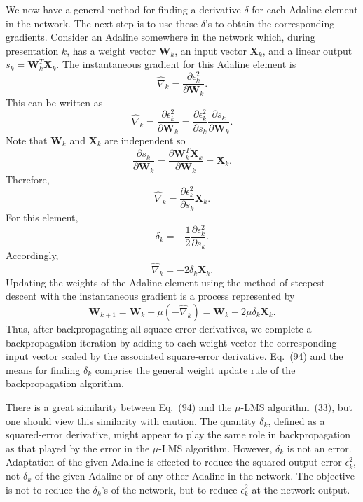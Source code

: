 \documentclass[10pt,twocolumn]{article}
\newcommand{\X}{\bm{X}}
\newcommand{\W}{\bm{W}}
\begin{document}
We now have a general method for finding a derivative $\delta$ for each Adaline
element in the network. The next step is to use these $\delta$'s to obtain the
corresponding gradients. Consider an Adaline somewhere in the network which, during
presentation $k$, has a weight vector $\W_k$, an input vector $\X_k$, and a linear
output $s_k = \W_k^{T}\X_k$. The instantaneous gradient for this Adaline element is
\begin{equation}
\hat{\nabla}_k = \frac{\partial\epsilon_k^2}{\partial\W_k}. \tag{88}
\end{equation}
This can be written as
\begin{equation}
\hat{\nabla}_k = \frac{\partial\epsilon_k^2}{\partial\W_k}
= \frac{\partial\epsilon_k^2}{\partial s_k}\frac{\partial s_k}{\partial\W_k}. \tag{89}
\end{equation}
Note that $\W_k$ and $\X_k$ are independent so
\begin{equation}
\frac{\partial s_k}{\partial\W_k} = \frac{\partial\W_k^{T}\X_k}{\partial\W_k} = \X_k. \tag{90}
\end{equation}
Therefore,
\begin{equation}
\hat{\nabla}_k = \frac{\partial\epsilon_k^2}{\partial s_k}\X_k. \tag{91}
\end{equation}
For this element,
\begin{equation}
\delta_k = -\frac{1}{2}\frac{\partial\epsilon_k^2}{\partial s_k}. \tag{92}
\end{equation}
Accordingly,
\begin{equation}
\hat{\nabla}_k = -2\delta_k\X_k. \tag{93}
\end{equation}
Updating the weights of the Adaline element using the method of steepest descent
with the instantaneous gradient is a process represented by
\begin{equation}
\W_{k+1} = \W_k + \mu(-\hat{\nabla}_k) = \W_k + 2\mu\delta_k\X_k. \tag{94}
\end{equation}
Thus, after backpropagating all square-error derivatives, we complete a
backpropagation iteration by adding to each weight vector the corresponding input
vector scaled by the associated square-error derivative. Eq.~(94) and the means for
finding $\delta_k$ comprise the general weight update rule of the backpropagation
algorithm.

There is a great similarity between Eq.~(94) and the $\mu$-LMS algorithm~(33), but
one should view this similarity with caution. The quantity $\delta_k$, defined as a
squared-error derivative, might appear to play the same role in backpropagation as
that played by the error in the $\mu$-LMS algorithm. However, $\delta_k$ is not an
error. Adaptation of the given Adaline is effected to reduce the squared output
error $\epsilon_k^2$, not $\delta_k$ of the given Adaline or of any other Adaline in
the network. The objective is not to reduce the $\delta_k$'s of the network, but to
reduce $\epsilon_k^2$ at the network output.
\end{document}
